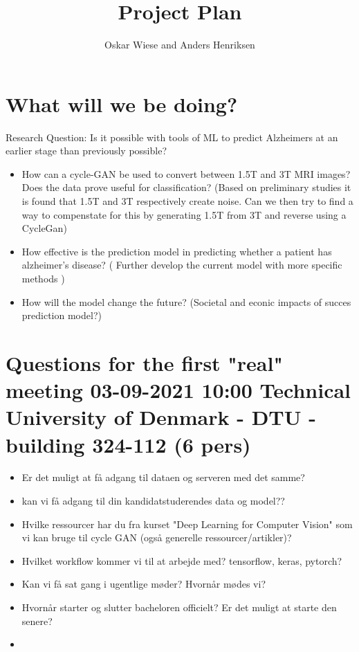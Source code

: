 \documentclass[]{article}
\title{Project Plan}
\author{Oskar Wiese and Anders Henriksen}
\begin{document}
\maketitle

\section{What will we be doing?}
Research Question: Is it possible with tools of ML to predict Alzheimers at an earlier stage than previously possible?
\begin{itemize}
	\item How can a cycle-GAN be used to convert between 1.5T and 3T MRI images? Does the data prove useful for classification? (Based on preliminary studies it is found that 1.5T and 3T respectively create noise. Can we then try to find a way to compenstate for this by generating 1.5T from 3T and reverse using a CycleGan)
	\item How effective is the prediction model in predicting whether a patient has alzheimer's disease? ( Further develop the current model with more specific methods )
	\item How will the model change the future? (Societal and econic impacts of succes prediction model?)
\end{itemize}

\section{Questions for the first "real" meeting 03-09-2021 10:00 Technical University of Denmark - DTU - building 324-112 (6 pers)}
\begin{itemize}
	\item Er det muligt at få adgang til dataen og serveren med det samme?
	\item kan vi få adgang til din kandidatstuderendes data og model??
	\item Hvilke ressourcer har du fra kurset "Deep Learning for Computer Vision" som vi kan bruge til cycle GAN (også generelle ressourcer/artikler)? 
	\item Hvilket workflow kommer vi til at arbejde med? tensorflow, keras, pytorch?
	\item Kan vi få sat gang i ugentlige møder? Hvornår mødes vi?
	\item Hvornår starter og slutter bacheloren officielt? Er det muligt at starte den senere?
	\item 
\end{itemize}
\end{document}
